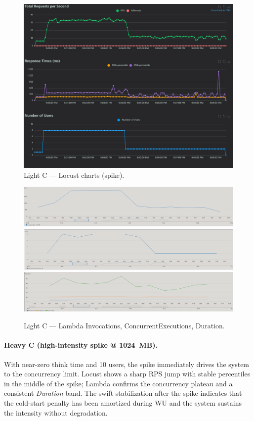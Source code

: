 \documentclass[11pt,a4paper]{article}
\begin{document}
\begin{figure}[h!] \centering
  \includegraphics[width=\linewidth]{"figures/lC - Charts.png"}
  \caption{Light C --- Locust charts (spike).}
\end{figure}

\begin{figure}[h!] \centering
  \includegraphics[width=.32\linewidth]{"figures/lC - Invocations.png"}\hfill
  \includegraphics[width=.32\linewidth]{"figures/lC - ConcEx.png"}\hfill
  \includegraphics[width=.32\linewidth]{"figures/lC - Duration.png"}
  \caption{Light C --- Lambda Invocations, ConcurrentExecutions, Duration.}
\end{figure}

\paragraph{Heavy C (high-intensity spike @ \SI{1024}{MB}).}
With near-zero think time and 10 users, the spike immediately drives the system to the concurrency limit. Locust shows a sharp RPS jump with stable percentiles in the middle of the spike; Lambda confirms the concurrency plateau and a consistent \emph{Duration} band. The swift stabilization after the spike indicates that the cold-start penalty has been amortized during WU and the system sustains the intensity without degradation.
\end{document}

